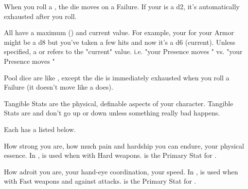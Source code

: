 {


When you roll a \UD, the die moves \DCDOWN on a Failure.  If your \UD is a d2, it's automatically exhausted after you roll.  

All \UD have a maximum (\MAX) and current value.  For example, your \UD for your Armor might be a d8 \MAX but you've taken a few hits and now it's a d6 (current).  Unless specified, a \DCDOWN or \DCUP refers to the "current" value.  i.e.  "your Presence moves \DCDOWN" vs. "your \MAX Presence moves \DCDOWN"


Pool dice are like \UD, except the die is immediately exhausted when you roll a Failure (it doesn't move \DCDOWN like a \UD does).  

\newpage


Tangible Stats are the physical, definable aspects of your character.  Tangible Stats are \STATIC and don't go up or down unless something really bad happens.

Each  has a  listed below.


How strong you are, how much pain and hardship you can endure, your physical essence.  In , \VIG is used when  with Hard weapons. \VIG is the Primary Stat for . 


How adroit you are, your hand-eye coordination, your speed.  In , \DEX is used when  with Fast weapons and  against attacks. \DEX is the Primary Stat for .  



}
